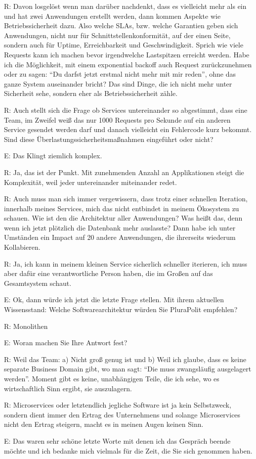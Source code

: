 \label{appendix:r-33}
R: Davon losgelöst wenn man darüber nachdenkt, dass es vielleicht mehr als ein und hat zwei Anwendungen erstellt werden, dann kommen Aspekte wie Betriebssicherheit dazu. Also welche SLAs, bzw. welche Garantien geben sich Anwendungen, nicht nur für Schnittstellenkonformität, auf der einen Seite, sondern auch für Uptime, Erreichbarkeit und Geschwindigkeit. Sprich wie viele Requests kann ich machen bevor irgendwelche Lastspitzen erreicht werden. Habe ich die Möglichkeit, mit einem exponential backoff auch Request zurückzunehmen oder zu sagen: “Du darfst jetzt erstmal nicht mehr mit mir reden”, ohne das ganze System auseinander bricht? Das sind Dinge, die ich nicht mehr unter Sicherheit sehe, sondern eher als Betriebssicherheit zähle.

\label{appendix:r-34}
R: Auch stellt sich die Frage ob Services untereinander so abgestimmt, dass eine Team, im Zweifel weiß das nur 1000 Requests pro Sekunde auf ein anderen Service gesendet werden darf und danach vielleicht ein Fehlercode kurz bekommt. Sind diese Überlastungssicherheitsmaßnahmen eingeführt oder nicht?

E: Das Klingt ziemlich komplex.

\label{appendix:r-35}
R: Ja, das ist der Punkt. Mit zunehmenden Anzahl an Applikationen steigt die Komplexität, weil jeder untereinander miteinander redet.

\label{appendix:r-36}
R: Auch muss man sich immer vergewissern, dass trotz einer schnellen Iteration, innerhalb meines Services, mich das nicht entbindet in meinem Ökosystem zu schauen. Wie ist den die Architektur aller Anwendungen? Was heißt das, denn wenn ich jetzt plötzlich die Datenbank  mehr auslasste? Dann habe ich unter Umständen ein Impact auf 20 andere Anwendungen, die ihrerseits wiederum Kollabieren.

\label{appendix:r-37}
R: Ja, ich kann in meinem kleinen Service sicherlich schneller iterieren, ich muss aber dafür eine verantwortliche Person haben, die im Großen auf das Gesamtsystem schaut.

E: Ok, dann würde ich jetzt die letzte Frage stellen. 
Mit ihrem aktuellen Wissensstand: Welche Softwarearchitektur würden Sie PluraPolit empfehlen?

\label{appendix:r-38}
R: Monolithen

E: Woran machen Sie Ihre Antwort fest?

\label{appendix:r-39} \label{appendix:r-40}
R: Weil das Team: a) Nicht groß genug ist und b) Weil ich glaube, dass es keine separate Business Domain gibt, wo man sagt: “Die muss zwangsläufig ausgelagert werden”.
Moment gibt es keine, unabhängigen Teile, die ich sehe, wo es wirtschaftlich Sinn ergibt, sie auszulagern.

\label{appendix:r-41}
R: Microservices oder letztendlich jegliche Software ist ja kein Selbstzweck, sondern dient immer den Ertrag des Unternehmens und solange Microservices nicht den Ertrag steigern, macht es in meinen Augen keinen Sinn.

E: Das waren sehr schöne letzte Worte mit denen ich das Gespräch beende möchte und ich bedanke mich vielmals für die Zeit, die Sie sich genommen haben.

